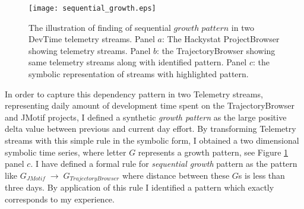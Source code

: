 \begin{figure}[tbp]
   \centering
   \texttt{[image: sequential\_growth.eps]}
   \caption{The illustration of finding of sequential $growth \; pattern$ in two DevTime telemetry streams. Panel $a$: The Hackystat ProjectBrowser showing telemetry streams. Panel $b$: the TrajectoryBrowser showing same telemetry streams along with identified pattern. Panel $c$: the symbolic representation of streams with highlighted pattern.}
   \label{fig:sequential_growth}
\end{figure}

In order to capture this dependency pattern in two Telemetry streams, representing daily amount of development time spent on the TrajectoryBrowser and JMotif projects, I defined a synthetic \textit{growth pattern} as the large positive delta value between previous and current day effort. By transforming Telemetry streams with this simple rule in the symbolic form, I obtained a two dimensional symbolic time series, where letter $G$ represents a growth pattern, see Figure \ref{fig:sequential_growth} panel $c$. I have defined a formal rule for \textit{sequential growth} pattern as the pattern like $G_{JMotif}\; \rightarrow \; G_{TrajectoryBrowser}$ where distance between these $G$s is less than three days. By application of this rule I identified a pattern which exactly corresponds to my experience.
